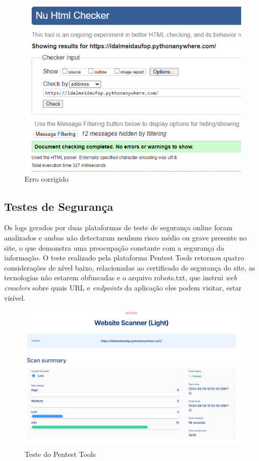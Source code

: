 \begin{figure}[htb] \caption{\label{fig_grafico}Erro corrigido} \begin{center} \includegraphics[scale=0.3]{./img/validator_sucess.png} \end{center}  \end{figure}

\subsection{Testes de Segurança}

Os logs gerados por duas plataformas de teste de segurança online foram analizados e ambas não detectaram nenhum risco médio ou grave presente no site, o que demonstra uma preocupação constante com a segurança da informação. O teste realizado pela plataforma Pentest Tools retornou quatro considerações de nível baixo, relacionadas ao certificado de segurança do site, as tecnologias não estarem obfuscadas e o arquivo robots.txt, que instrui \textit{web crawlers} sobre quais \ac{URL} e \textit{endpoints} da aplicação eles podem visitar, estar visível.

\begin{figure}[htb] \caption{\label{fig_grafico}Teste do Pentest Tools} \begin{center} \includegraphics[scale=0.3]{./img/pentest.png} \end{center}  \end{figure}

